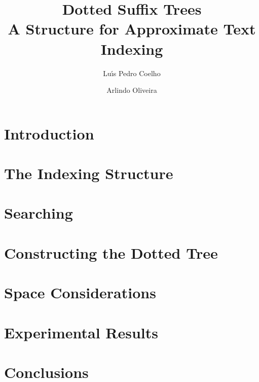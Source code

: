 \documentclass[a4paper,10pt]{article}
\title{Dotted Suffix Trees\\A Structure for Approximate Text Indexing}
\author{Lu\'{\i}s Pedro Coelho \and Arlindo Oliveira}
\begin{document}
\maketitle

\begin{abstract}

\end{abstract}

\section{Introduction}\label{sec:introduction}


\section{The Indexing Structure}\label{sec:structure}


\section{Searching}\label{sec:search}


\section{Constructing the Dotted Tree}\label{sec:construction}


\section{Space Considerations}\label{sec:space}


\section{Experimental Results}\label{sec:experimental}


\section{Conclusions}\label{sec:conclusion}




\end{document}
